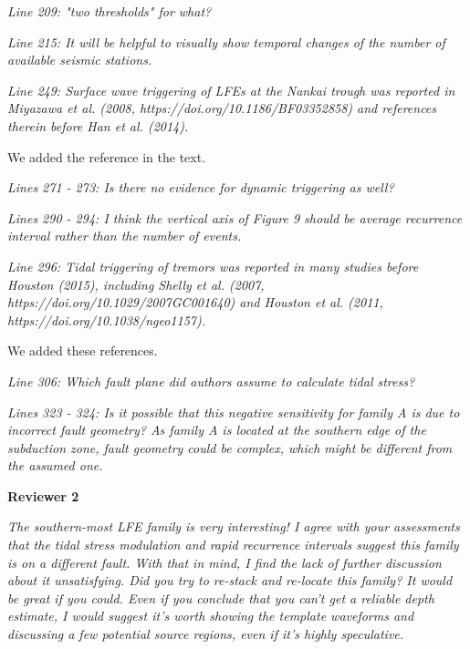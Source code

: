 \documentclass[letterpaper, 12pt]{article}
\begin{document}
\bigskip

\textit{Line 209: "two thresholds" for what?}

\bigskip

\textit{Line 215: It will be helpful to visually show temporal changes of the number of available seismic stations.}

\bigskip

\textit{Line 249: Surface wave triggering of LFEs at the Nankai trough was reported in Miyazawa et al. (2008, https://doi.org/10.1186/BF03352858) and references therein before Han et al. (2014).}

\bigskip

We added the reference in the text.

\bigskip

\textit{Lines 271 - 273: Is there no evidence for dynamic triggering as well?}

\bigskip

\textit{Lines 290 - 294: I think the vertical axis of Figure 9 should be average recurrence interval rather than the number of events.}

\bigskip

\textit{Line 296: Tidal triggering of tremors was reported in many studies before Houston (2015), including Shelly et al. (2007, https://doi.org/10.1029/2007GC001640) and Houston et al. (2011, https://doi.org/10.1038/ngeo1157).}

\bigskip

We added these references.

\bigskip

\textit{Line 306: Which fault plane did authors assume to calculate tidal stress?}

\bigskip

\textit{Lines 323 - 324: Is it possible that this negative sensitivity for family A is due to incorrect fault geometry? As family A is located at the southern edge of the subduction zone, fault geometry could be complex, which might be different from the assumed one.}

\bigskip

\textbf{Reviewer 2}

\bigskip

\textit{The southern-most LFE family is very interesting! I agree with your assessments that the tidal stress modulation and rapid recurrence intervals suggest this family is on a different fault. With that in mind, I find the lack of further discussion about it unsatisfying. Did you try to re-stack and re-locate this family? It would be great if you could. Even if you conclude that you can't get a reliable depth estimate, I would suggest it's worth showing the template waveforms and discussing a few potential source regions, even if it's highly speculative.}
\end{document}
